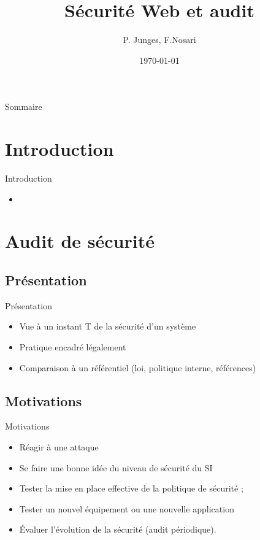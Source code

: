 \documentclass{beamer}
\title{Sécurité Web et audit}
\author{P. Junges, F.Nosari}
\institute{Faculté des Sciences et Technologies}
\date{\today}
\begin{document}
\begin{frame}
	\titlepage
\end{frame}

\begin{frame}{Sommaire}
	\tableofcontents
\end{frame}

\section{Introduction}
	\begin{frame}{Introduction}
		\begin{itemize}
			\item %
		\end{itemize}
	\end{frame}

\section{Audit de sécurité}
	\subsection{Présentation}
	\begin{frame}{Présentation}
		\begin{itemize}
			\item Vue à un instant T de la sécurité d'un système
			\item Pratique encadré légalement
			\item Comparaison à un référentiel (loi, politique interne, références)
		\end{itemize}
	\end{frame}
	\subsection{Motivations}
	\begin{frame}{Motivations}
		\begin{itemize}
			\item Réagir à une attaque
			\item Se faire une bonne idée du niveau de sécurité du SI
			\item Tester la mise en place effective de la politique de sécurité ;
			\item Tester un nouvel équipement ou une nouvelle application
			\item Évaluer l'évolution de la sécurité (audit périodique).
		\end{itemize}
	\end{frame}
\end{document}
